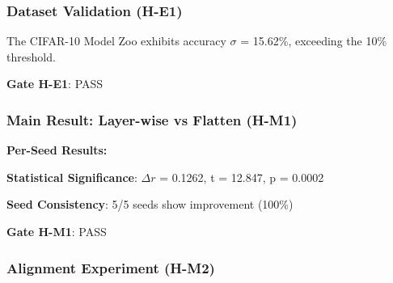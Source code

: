 
\subsubsection{Dataset Validation (H-E1)}

The CIFAR-10 Model Zoo exhibits accuracy $\sigma$ = 15.62\%, exceeding the 10\% threshold.

\textbf{Gate H-E1}: PASS

\subsubsection{Main Result: Layer-wise vs Flatten (H-M1)}

\begin{table}[htbp]
\centering
{}
\end{table}

\textbf{Per-Seed Results:}

\begin{table}[htbp]
\centering
{}
\end{table}

\textbf{Statistical Significance}: $\Delta r$ = 0.1262, t = 12.847, p = 0.0002

\textbf{Seed Consistency}: 5/5 seeds show improvement (100\%)

\textbf{Gate H-M1}: PASS

\subsubsection{Alignment Experiment (H-M2)}

